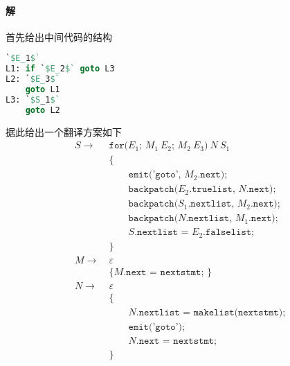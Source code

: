 \documentclass{article}
\begin{document}
\begin{multicols}{2}
\paragraph{解}
首先给出中间代码的结构
\begin{lstlisting}[language = Pascal, alsolanguage = C]
    `$E_1$`
L1: if `$E_2$` goto L3
L2: `$E_3$`
    goto L1
L3: `$S_1$`
    goto L2
\end{lstlisting}

据此给出一个翻译方案如下
\begin{align*}
    S \rightarrow\  &\texttt{for(}E_1\texttt{; }M_1\ E_2\texttt{; }M_2\ E_3\texttt{)}\ N\ S_1 \\
                    &\texttt{\{} \\
                    &\qquad \texttt{emit('goto', }M_2\texttt{.next);} \\
                    &\qquad \texttt{backpatch(}E_2\texttt{.truelist, }N\texttt{.next);} \\
                    &\qquad \texttt{backpatch(}S_1\texttt{.nextlist, }M_2\texttt{.next);} \\
                    &\qquad \texttt{backpatch(}N\texttt{.nextlist, }M_1\texttt{.next);} \\
                    &\qquad S\texttt{.nextlist = }E_2\texttt{.falselist;} \\
                    &\texttt{\}}\\
    M \rightarrow\  &\varepsilon \\ &\texttt{\{ }M\texttt{.next = nextstmt; \}}\\
    N \rightarrow\  &\varepsilon \\
                    &\texttt{\{} \\
                    &\qquad N\texttt{.nextlist = makelist(nextstmt);} \\
                    &\qquad \texttt{emit('goto');} \\
                    &\qquad N\texttt{.next = nextstmt;} \\
                    &\texttt{\}}\\
\end{align*}
\end{multicols}
\end{document}
